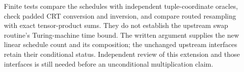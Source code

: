 \documentclass[11pt]{article}
\begin{document}
Finite tests compare the schedules with independent tuple-coordinate oracles,
check padded CRT conversion and inversion, and compare routed resampling with
exact tensor-product sums. They do not establish the upstream swap routine's
Turing-machine time bound. The written argument supplies the new linear
schedule count and its composition; the unchanged upstream interfaces retain
their conditional status. Independent review of this extension and those
interfaces is still needed before an unconditional multiplication claim.
\end{document}
